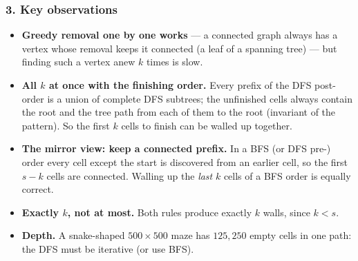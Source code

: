 \begin{diagrambox}
\end{diagrambox}

\subsubsection*{3. Key observations}

\begin{itemize}[leftmargin=*]
    \item \textbf{Greedy removal one by one works} --- a connected graph always has a vertex whose removal keeps it connected (a leaf of a spanning tree) --- but finding such a vertex anew $k$ times is slow.
    \item \textbf{All $k$ at once with the finishing order.} Every prefix of the DFS post-order is a union of complete DFS subtrees; the unfinished cells always contain the root and the tree path from each of them to the root (invariant of the pattern). So the first $k$ cells to finish can be walled up together.
    \item \textbf{The mirror view: keep a connected prefix.} In a BFS (or DFS pre-) order every cell except the start is discovered from an earlier cell, so the first $s - k$ cells are connected. Walling up the \emph{last} $k$ cells of a BFS order is equally correct.
    \item \textbf{Exactly $k$, not at most.} Both rules produce exactly $k$ walls, since $k < s$.
    \item \textbf{Depth.} A snake-shaped $500 \times 500$ maze has $125{,}250$ empty cells in one path: the DFS must be iterative (or use BFS).
\end{itemize}

